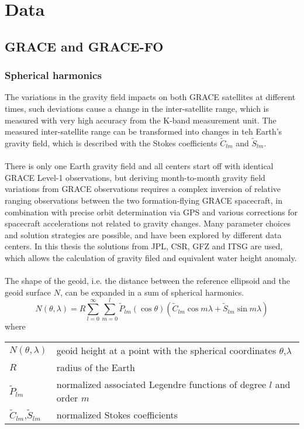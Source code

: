 
\chapter{Data}
\section{GRACE and GRACE-FO}
\subsection{Spherical harmonics}
The variations in the gravity field impacts on both GRACE satellites at different times, such deviations cause a change in the inter-satellite range, which is measured with very high accuracy from the K-band measurement unit. The measured inter-satellite range can be transformed into changes in teh Earth's gravity field, which is described with the Stokes coefficients $\tilde{C}_{lm}$ and $\tilde{S}_{lm}$.\\\\
There is only one Earth gravity field and all centers start off with identical GRACE Level-1 observations, but deriving month-to-month gravity field variations from GRACE observations requires a complex inversion of relative ranging observations between the two formation-flying GRACE spacecraft, in combination with precise orbit determination via GPS and various corrections for spacecraft accelerations not related to gravity changes. Many parameter choices and solution strategies are possible, and have been explored by different data centers. In this thesis the solutions from JPL, CSR, GFZ and ITSG are used, which allows the calculation of gravity filed and equivalent water height anomaly. \\\\
The shape of the geoid, i.e. the distance between the reference ellipsoid and the geoid surface $N$, can be expanded in a sum of spherical harmonics.
\begin{equation}
	N(\theta, \lambda) = R \sum_{l=0}^{\infty} \sum_{m=0}^{l} \tilde{P}_{lm}(\cos \theta)(\tilde{C}_{lm} \cos m\lambda + \tilde{S}_{lm}\sin m\lambda)
\end{equation}
where
\begin{table}[htbp]
\begin{tabular}{ll}	
$N(\theta, \lambda)$	&  geoid height at a point with the spherical coordinates $\theta$,$\lambda$\\ 
$R$	&  radius of the Earth\\ 
$\tilde{P}_{lm}$	&  normalized associated Legendre functions of degree $l$ and order $m$\\ 
$\tilde{C}_{lm}$,$\tilde{S}_{lm}$	&  normalized Stokes coefficients\\ 
\end{tabular}
\end{table}
